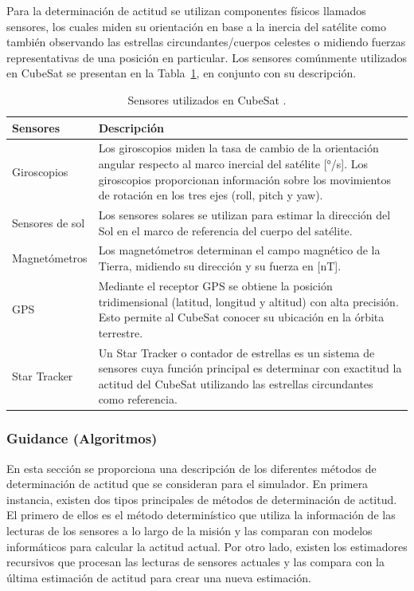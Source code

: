 Para la determinación de actitud se utilizan componentes físicos llamados sensores, los cuales miden su orientación en base a la inercia del satélite como también observando las estrellas circundantes/cuerpos celestes o midiendo fuerzas representativas de una posición en particular\cite{ref6}. Los sensores comúnmente utilizados en CubeSat se presentan en la Tabla~\ref{tab:sensores}, en conjunto con su descripción.


\begin{table}[h!]
	\centering
	\caption{Sensores utilizados en CubeSat \cite{ref6}.}
	\begin{tabular}{|l|p{10cm}|}
		\hline
		\textbf{Sensores} & \textbf{Descripción} \\ \hline
		Giroscopios & Los giroscopios miden la tasa de cambio de la orientación angular respecto al marco inercial del satélite [°/s]. Los giroscopios proporcionan información sobre los movimientos de rotación en los tres ejes (roll, pitch y yaw). \\ \hline
		Sensores de sol & Los sensores solares se utilizan para estimar la dirección del Sol en el marco de referencia del cuerpo del satélite. \\ \hline
		Magnetómetros & Los magnetómetros determinan el campo magnético de la Tierra, midiendo su dirección y su fuerza en [nT]. \\ \hline
		GPS & Mediante el receptor GPS se obtiene la posición tridimensional (latitud, longitud y altitud) con alta precisión. Esto permite al CubeSat conocer su ubicación en la órbita terrestre. \\ \hline
		Star Tracker & Un Star Tracker o contador de estrellas es un sistema de sensores cuya función principal es determinar con exactitud la actitud del CubeSat utilizando las estrellas circundantes como referencia. \\ \hline
	\end{tabular}
	\label{tab:sensores}
\end{table}

\subsubsection{Guidance (Algoritmos)}

En esta sección se proporciona una descripción de los diferentes métodos de determinación de actitud que se consideran para el simulador. En primera instancia, existen dos tipos principales de métodos de determinación de actitud. El primero de ellos es el método determinístico que utiliza la información de las lecturas de los sensores a lo largo de la misión y las comparan con modelos informáticos para calcular la actitud actual\cite{ref15}. Por otro lado, existen los estimadores recursivos que procesan las lecturas de sensores actuales y las compara con la última estimación de actitud para crear una nueva estimación.

